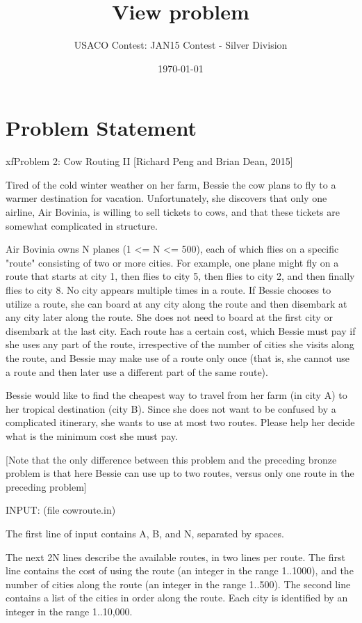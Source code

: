 \documentclass[12pt]{article}
\title{View problem}
\author{USACO Contest: JAN15 Contest - Silver Division}
\date{\today}
\begin{document}
\maketitle

\section*{Problem Statement}

xfProblem 2: Cow Routing II [Richard Peng and Brian Dean, 2015]

Tired of the cold winter weather on her farm, Bessie the cow plans to
fly to a warmer destination for vacation.  Unfortunately, she
discovers that only one airline, Air Bovinia, is willing to sell
tickets to cows, and that these tickets are somewhat complicated in
structure.

Air Bovinia owns N planes (1 <= N <= 500), each of which flies on a
specific "route" consisting of two or more cities.  For example, one
plane might fly on a route that starts at city 1, then flies to city
5, then flies to city 2, and then finally flies to city 8.  No city
appears multiple times in a route.  If Bessie chooses to utilize a
route, she can board at any city along the route and then disembark at
any city later along the route.  She does not need to board at the
first city or disembark at the last city.  Each route has a certain
cost, which Bessie must pay if she uses any part of the route,
irrespective of the number of cities she visits along the route, and
Bessie may make use of a route only once (that is, she cannot use a
route and then later use a different part of the same route).

Bessie would like to find the cheapest way to travel from her farm
(in city A) to her tropical destination (city B). Since she does not
want to be confused by a complicated itinerary, she wants to use at
most two routes.  Please help her decide what is the minimum cost she
must pay.

[Note that the only difference between this problem and the preceding
bronze problem is that here Bessie can use up to two routes, versus
only one route in the preceding problem]

INPUT: (file cowroute.in)

The first line of input contains A, B, and N, separated by spaces.

The next 2N lines describe the available routes, in two lines per
route. The first line contains the cost of using the route (an integer
in the range 1..1000), and the number of cities along the route (an
integer in the range 1..500).  The second line contains a list of the
cities in order along the route.  Each city is identified by an
integer in the range 1..10,000.
\end{document}

